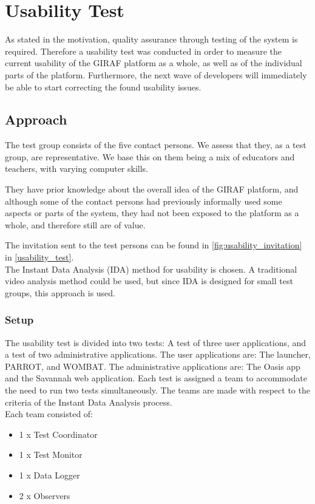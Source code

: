 \section{Usability Test}
\label{common:sec:usability_test}
As stated in the motivation, quality assurance through testing of the system is required. Therefore a usability test was conducted in order to measure the current usability of the GIRAF platform as a whole, as well as of the individual parts of the platform. Furthermore, the next wave of developers will immediately be able to start correcting the found usability issues.

\subsection{Approach}
The test group consists of the five contact persons. We assess that they, as a test group, are representative. We base this on them being a mix of educators and teachers, with varying computer skills.

They have prior knowledge about the overall idea of the GIRAF platform, and although some of the contact persons had previously informally used some aspects or parts of the system, they had not been exposed to the platform as a whole, and therefore still are of value.

The invitation sent to the test persons can be found in \autoref{fig:usability_invitation} in \autoref{usability_test}.\\

The Instant Data Analysis (IDA) method for usability is chosen. A traditional video analysis method could be used, but since IDA is designed for small test groups, this approach is used. \cite{usability:ida}

\subsubsection*{Setup}
The usability test is divided into two tests: A test of three user applications, and a test of two administrative applications. 
The user applications are: The launcher, PARROT, and WOMBAT. The administrative applications are: The Oasis app and the Savannah web application.
Each test is assigned a team to accommodate the need to run two tests simultaneously.
The teams are made with respect to the criteria of the Instant Data Analysis process.\\
Each team consisted of:

\begin{itemize}
	\item 1 x Test Coordinator
	\item 1 x Test Monitor
	\item 1 x Data Logger
	\item 2 x Observers
\end{itemize}

